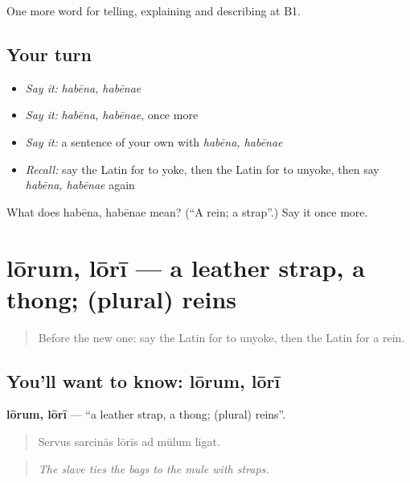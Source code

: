 \begin{grammarlens}[title={What you've built}]
One more word for telling, explaining and describing at B1.
\end{grammarlens}

\subsection*{Your turn}
\begin{itemize}
\raggedright
  \item \emph{Say it:} \emph{habēna, habēnae}
  \item \emph{Say it:} \emph{habēna, habēnae}, once more
  \item \emph{Say it:} a sentence of your own with \emph{habēna, habēnae}
  \item \emph{Recall:} say the Latin for to yoke, then the Latin for to unyoke, then say \emph{habēna, habēnae} again
\end{itemize}

\begin{tcolorbox}[breakable,colback=teal!4,colframe=teal!35!black,title={Before you move on}]
What does habēna, habēnae mean? (\textquotedblleft{}A rein; a strap\textquotedblright{}.) Say it once more.
\end{tcolorbox}
\section[lōrum, lōrī]{lōrum, lōrī — a leather strap, a thong; (plural) reins}

\label{lesson:LA-C431-lorum}



\begin{quote}
Before the new one: say the Latin for to unyoke, then the Latin for a rein.
\end{quote}

\subsection*{You'll want to know: lōrum, lōrī}
\textbf{lōrum, lōrī} — \textquotedblleft{}a leather strap, a thong; (plural) reins\textquotedblright{}.

\begin{quote}
Servus sarcinās lōrīs ad mūlum ligat.
\end{quote}

\begin{quote}
\emph{The slave ties the bags to the mule with straps.}
\end{quote}

